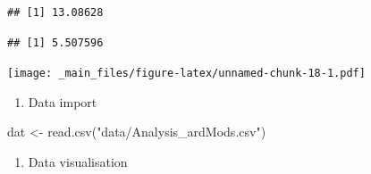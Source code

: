 \documentclass[
]{book}
\newenvironment{Shaded}{\begin{snugshade}}{\end{snugshade}}
\newcommand{\AttributeTok}[1]{\textcolor[rgb]{0.77,0.63,0.00}{#1}}
\newcommand{\CommentTok}[1]{\textcolor[rgb]{0.56,0.35,0.01}{\textit{#1}}}
\newcommand{\ConstantTok}[1]{\textcolor[rgb]{0.00,0.00,0.00}{#1}}
\newcommand{\FunctionTok}[1]{\textcolor[rgb]{0.00,0.00,0.00}{#1}}
\newcommand{\NormalTok}[1]{#1}
\newcommand{\OtherTok}[1]{\textcolor[rgb]{0.56,0.35,0.01}{#1}}
\newcommand{\SpecialCharTok}[1]{\textcolor[rgb]{0.00,0.00,0.00}{#1}}
\newcommand{\StringTok}[1]{\textcolor[rgb]{0.31,0.60,0.02}{#1}}
\providecommand{\tightlist}{%
  \setlength{\itemsep}{0pt}\setlength{\parskip}{0pt}}
\begin{document}
\begin{verbatim}
## [1] 13.08628
\end{verbatim}

\begin{Shaded}
\end{Shaded}

\begin{verbatim}
## [1] 5.507596
\end{verbatim}

\begin{Shaded}
\end{Shaded}

\texttt{[image: \_main\_files/figure-latex/unnamed-chunk-18-1.pdf]}

\begin{enumerate}
\def\labelenumi{\arabic{enumi}.}
\setcounter{enumi}{2}
\tightlist
\item
  Data import
\end{enumerate}

\begin{Shaded}
\begin{Highlighting}[]
\NormalTok{dat }\OtherTok{\textless{}{-}} \FunctionTok{read.csv}\NormalTok{(}\StringTok{"data/Analysis\_ardMods.csv"}\NormalTok{)}
\end{Highlighting}
\end{Shaded}

\begin{enumerate}
\def\labelenumi{\arabic{enumi}.}
\setcounter{enumi}{3}
\tightlist
\item
  Data visualisation
\end{enumerate}

\begin{Shaded}
\end{Shaded}
\end{document}
